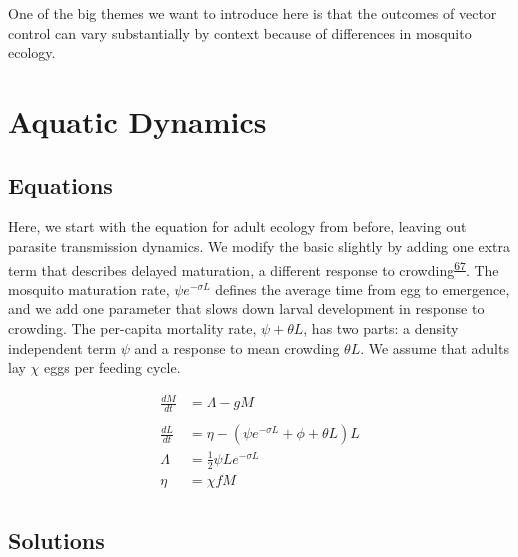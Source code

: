\documentclass[
]{book}
\begin{document}
One of the big themes we want to introduce here is that the outcomes of vector control can vary substantially by context because of differences in mosquito ecology.

\hypertarget{aquatic-dynamics}{%
\section{Aquatic Dynamics}\label{aquatic-dynamics}}

\hypertarget{equations}{%
\subsection{Equations}\label{equations}}

Here, we start with the equation for adult ecology from before, leaving out parasite transmission dynamics. We modify the basic slightly by adding one extra term that describes delayed maturation, a different response to crowding\textsuperscript{\protect\hyperlink{ref-SmithDL2013_LarvalDynamics}{67}}. The mosquito maturation rate, \(\psi e^{-\sigma L}\) defines the average time from egg to emergence, and we add one parameter that slows down larval development in response to crowding. The per-capita mortality rate, \(\psi + \theta L\), has two parts: a density independent term \(\psi\) and a response to mean crowding \(\theta L\). We assume that adults lay \(\chi\) eggs per feeding cycle.

\begin{equation}
\begin{array}{rl}
\frac{dM}{dt} &= \Lambda - g M\\  \\ \hline 
\frac{dL}{dt} &= \eta - (\psi e^{-\sigma L} + \phi + \theta L) L \\ 
\Lambda &= \frac{1}{2} \psi L e^{-\sigma L}\\ 
\eta &= \chi f M \\ 
\end{array}
\end{equation}

\hypertarget{solutions-1}{%
\subsection{Solutions}\label{solutions-1}}
\end{document}
